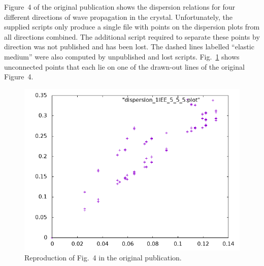 Figure~4 of the original publication shows the dispersion relations for four different directions of wave propagation in the crystal. Unfortunately, the supplied scripts only produce a single file with points on the dispersion plots from all directions combined. The additional script required to separate these points by direction was not published and has been lost. The dashed lines labelled ``elastic medium'' were also computed by unpublished and lost scripts. Fig.~\ref{fig4} shows unconnected points that each lie on one of the drawn-out lines of the original Figure~4.
\begin{figure}
\includegraphics[width=.9\textwidth]{../reproduction/fig4.png}
\caption{Reproduction of Fig.~4 in the original publication.}
\label{fig4}
\end{figure}

